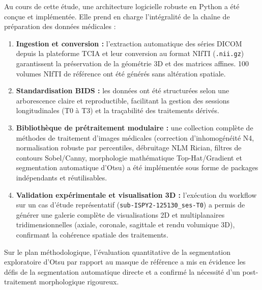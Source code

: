 \documentclass[12pt,a4paper]{report}
\begin{document}
    Au cours de cette étude, une architecture logicielle robuste en Python a été conçue et implémentée. Elle prend en charge l'intégralité de la chaîne de préparation des données médicales :
    \begin{enumerate}
        \item \textbf{Ingestion et conversion :} l'extraction automatique des séries DICOM depuis la plateforme TCIA et leur conversion au format NIfTI (\texttt{.nii.gz}) garantissent la préservation de la géométrie 3D et des matrices affines. 100 volumes NIfTI de référence ont été générés sans altération spatiale.
        \item \textbf{Standardisation BIDS :} les données ont été structurées selon une arborescence claire et reproductible, facilitant la gestion des sessions longitudinales (T0 à T3) et la traçabilité des traitements dérivés.
        \item \textbf{Bibliothèque de prétraitement modulaire :} une collection complète de méthodes de traitement d'images médicales (correction d'inhomogénéité N4, normalisation robuste par percentiles, débruitage NLM Rician, filtres de contours Sobel/Canny, morphologie mathématique Top-Hat/Gradient et segmentation automatique d'Otsu) a été implémentée sous forme de packages indépendants et réutilisables.
        \item \textbf{Validation expérimentale et visualisation 3D :} l'exécution du workflow sur un cas d'étude représentatif (\texttt{sub-ISPY2-125130\_ses-T0}) a permis de générer une galerie complète de visualisations 2D et multiplanaires tridimensionnelles (axiale, coronale, sagittale et rendu volumique 3D), confirmant la cohérence spatiale des traitements.
    \end{enumerate}

    Sur le plan méthodologique, l'évaluation quantitative de la segmentation exploratoire d'Otsu par rapport au masque de référence a mis en évidence les défis de la segmentation automatique directe et a confirmé la nécessité d'un post-traitement morphologique rigoureux.
\end{document}
